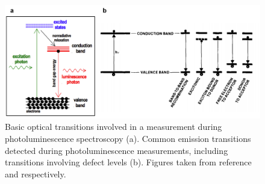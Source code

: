\documentclass[11pt, twoside]{report}
\begin{document}
\begin{figure}[h!]
  \centering
    \includegraphics[width=1.0\textwidth]{figures/PL_transitions.png}
    \caption{Basic optical transitions involved in a measurement during photoluminescence spectroscopy (a). Common emission transitions detected during photoluminescence measurements, including transitions involving defect levels (b). Figures taken from reference  and  respectively.}
  \label{PL_transitions}
\end{figure}
\end{document}
